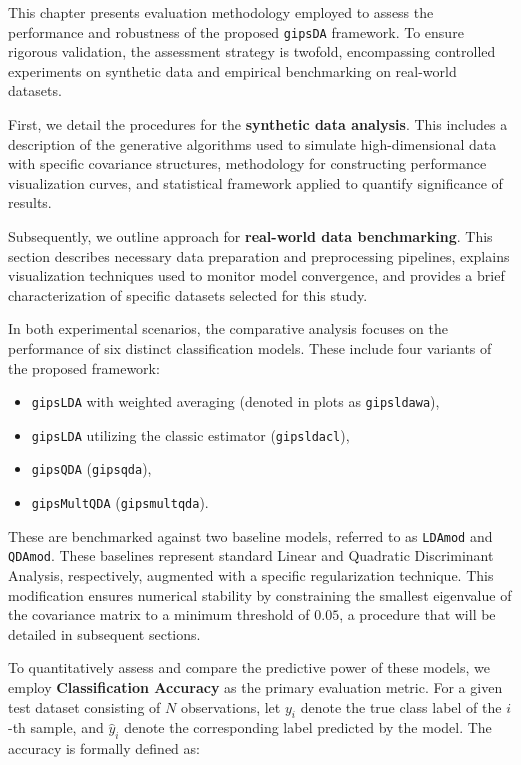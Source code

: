 \documentclass[a4paper,11pt,twoside]{report}
\theoremstyle{definition}
\begin{document}
This chapter presents evaluation methodology employed to assess the performance and robustness of the proposed \texttt{gipsDA} framework. To ensure rigorous validation, the assessment strategy is twofold, encompassing controlled experiments on synthetic data and empirical benchmarking on real-world datasets.

First, we detail the procedures for the \textbf{synthetic data analysis}. This includes a description of the generative algorithms used to simulate high-dimensional data with specific covariance structures, methodology for constructing performance visualization curves, and statistical framework applied to quantify significance of results.

Subsequently, we outline approach for \textbf{real-world data benchmarking}. This section describes necessary data preparation and preprocessing pipelines, explains visualization techniques used to monitor model convergence, and provides a brief characterization of specific datasets selected for this study.

In both experimental scenarios, the comparative analysis focuses on the performance of six distinct classification models. These include four variants of the proposed framework:
\begin{itemize}
    \item \texttt{gipsLDA} with weighted averaging (denoted in plots as \texttt{gipsldawa}),
    \item \texttt{gipsLDA} utilizing the classic estimator (\texttt{gipsldacl}),
    \item \texttt{gipsQDA} (\texttt{gipsqda}),
    \item \texttt{gipsMultQDA} (\texttt{gipsmultqda}).
\end{itemize}
These are benchmarked against two baseline models, referred to as \texttt{LDAmod} and \texttt{QDAmod}.
These baselines represent standard Linear and Quadratic Discriminant Analysis, respectively, augmented with a specific regularization technique.
This modification ensures numerical stability by constraining the smallest eigenvalue of the covariance matrix to a minimum threshold of $0.05$, a procedure that will be detailed in subsequent sections.

To quantitatively assess and compare the predictive power of these models, we employ \textbf{Classification Accuracy} as the primary evaluation metric. For a given test dataset consisting of $N$ observations, let $y_i$ denote the true class label of the $i$-th sample, and $\hat{y}_i$ denote the corresponding label predicted by the model. The accuracy is formally defined as:
\end{document}
